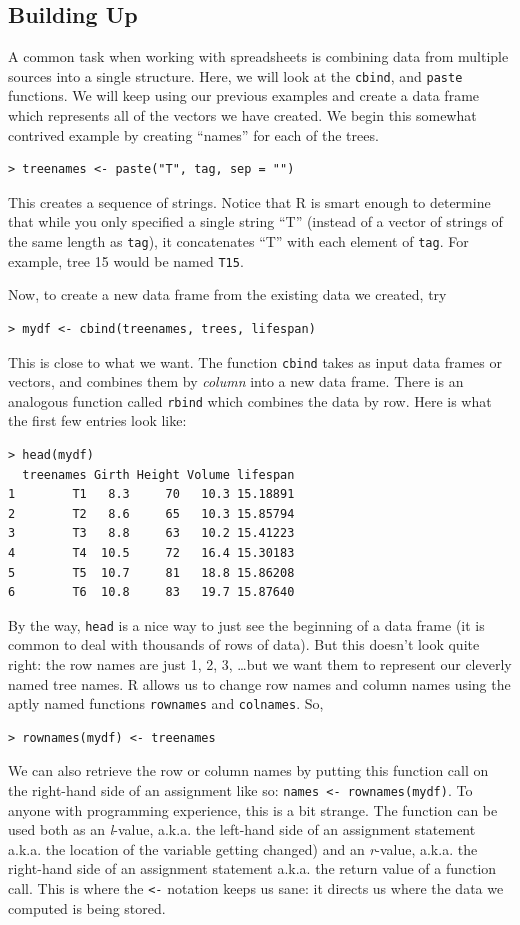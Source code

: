 \documentclass[12pt]{article}
\begin{document}
\subsection{Building Up}
A common task when working with spreadsheets is combining data from multiple sources into a single structure. Here, we will look at the \verb|cbind|, and \verb|paste| functions. We will keep using our previous examples and create a data frame which represents all of the vectors we have created. We begin this somewhat contrived example by creating ``names'' for each of the trees.

\begin{verbatim}
> treenames <- paste("T", tag, sep = "")
\end{verbatim}

This creates a sequence of strings. Notice that R is smart enough to determine that while you only specified a single string ``T'' (instead of a vector of strings of the same length as \verb|tag|), it concatenates ``T'' with each element of \verb|tag|. For example, tree 15 would be named \verb|T15|.

Now, to create a new data frame from the existing data we created, try
\begin{verbatim}
> mydf <- cbind(treenames, trees, lifespan)
\end{verbatim}
This is close to what we want. The function \verb|cbind| takes as input data frames or vectors, and combines them by \emph{column} into a new data frame. There is an analogous function called \verb|rbind| which combines the data by row. Here is what the first few entries look like:

\begin{Verbatim}[frame=single, fontsize=\small]
> head(mydf)
  treenames Girth Height Volume lifespan
1        T1   8.3     70   10.3 15.18891
2        T2   8.6     65   10.3 15.85794
3        T3   8.8     63   10.2 15.41223
4        T4  10.5     72   16.4 15.30183
5        T5  10.7     81   18.8 15.86208
6        T6  10.8     83   19.7 15.87640
\end{Verbatim}
By the way, \verb|head| is a nice way to just see the beginning of a data frame (it is common to deal with thousands of rows of data). But this doesn't look quite right: the row names are just 1, 2, 3, \dots but we want them to represent our cleverly named tree names. R allows us to change row names and column names using the aptly named functions \verb|rownames| and \verb|colnames|. So,
\begin{verbatim}
> rownames(mydf) <- treenames
\end{verbatim}
We can also retrieve the row or column names by putting this function call on the right-hand side of an assignment like so: \verb|names <- rownames(mydf)|. To anyone with programming experience, this is a bit strange. The function can be used both as an \emph{l}-value, a.k.a. the left-hand side of an assignment statement a.k.a. the location of the variable getting changed) and an \emph{r}-value, a.k.a. the right-hand side of an assignment statement a.k.a. the return value of a function call. This is where the \verb|<-| notation keeps us sane: it directs us where the data we computed is being stored.
\end{document}

